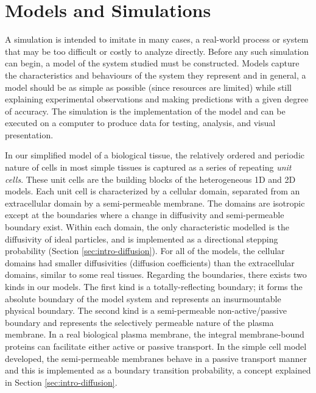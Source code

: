 \chapter{Models and Simulations}
\label{chapter:mods-sims}
	
	A simulation is intended to imitate in many cases, a real-world process or system that may be too difficult or costly to analyze directly. Before any such simulation can begin, a model of the system studied must be constructed. Models capture the characteristics and behaviours of the system they represent and in general, a model should be as simple as possible (since resources are limited) while still explaining experimental observations and making predictions with a given degree of accuracy. The simulation is the implementation of the model and can be executed on a computer to produce data for testing, analysis, and visual presentation.

	In our simplified model of a biological tissue, the relatively ordered and periodic nature of cells in most simple tissues is captured as a series of repeating \textsl{unit cells}. These unit cells are the building blocks of the heterogeneous 1D and 2D models. Each unit cell is characterized by a cellular domain, separated from an extracellular domain by a semi-permeable membrane. The domains are isotropic except at the boundaries where a change in diffusivity and semi-permeable boundary exist. Within each domain, the only characteristic modelled is the diffusivity of ideal particles, and is implemented as a directional stepping probability (Section \ref{sec:intro-diffusion}). For all of the models, the cellular domains had smaller diffusivities (diffusion coefficients) than the extracellular domains, similar to some real tissues. Regarding the boundaries, there exists two kinds in our models. The first kind is a totally-reflecting boundary; it forms the absolute boundary of the model system and represents an insurmountable physical boundary. The second kind is a semi-permeable non-active/passive boundary and represents the selectively permeable nature of the plasma membrane. In a real biological plasma membrane, the integral membrane-bound proteins can facilitate either active or passive transport. In the simple cell model developed, the semi-permeable membranes behave in a passive transport manner and this is implemented as a boundary transition probability, a concept explained in Section \ref{sec:intro-diffusion}.
	
